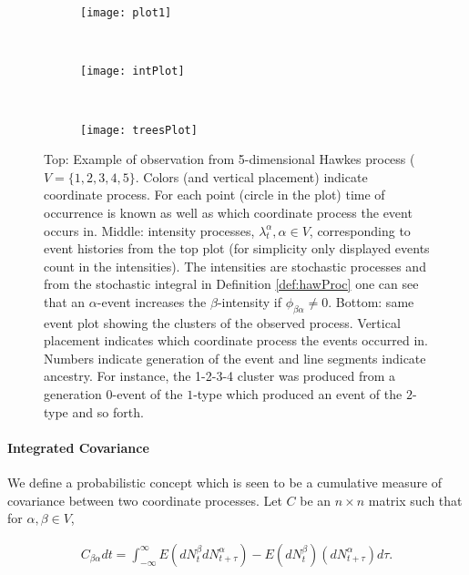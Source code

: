 \documentclass[accepted]{uai2021} %
\begin{document}
\begin{figure}
				\begin{subfigure}{0.48\linewidth}
					\centering
					\texttt{[image: plot1]}
				\end{subfigure} \\
				\begin{subfigure}{0.48\linewidth}
					\centering
					\texttt{[image: intPlot]}
				\end{subfigure} \\
				\begin{subfigure}{0.48\linewidth}
					\centering
					\texttt{[image: treesPlot]}
				\end{subfigure}
				\caption{Top: Example of observation from 5-dimensional Hawkes 
				process ($V = \{1,2,3,4,5\}$. Colors (and vertical placement) 
				indicate coordinate 
				process. For each point 
				(circle in the plot) time of occurrence is known as well as 
				which coordinate process the event occurs in. Middle: intensity 
				processes, $\lambda_t^\alpha, \alpha\in V$, corresponding to 
				event 
				histories from the top plot (for simplicity only displayed 
				events 
				count in the intensities). The intensities are stochastic 
				processes and from the stochastic integral in Definition 
				\ref{def:hawProc} one can see that an $\alpha$-event increases 
				the $\beta$-intensity if $\phi_{\beta\alpha} \neq 0$. 
				Bottom: same event plot showing the 
				clusters of the observed process. Vertical placement indicates 
				which coordinate process the events occurred in. Numbers 
				indicate 
				generation 
				of the event and line segments indicate ancestry. For instance, 
				the 1-2-3-4 cluster was produced from a generation 0-event of 
				the 
				$1$-type which produced an event of the $2$-type and so forth.}
			\label{fig:haw}
\end{figure}


\paragraph{Integrated Covariance}

We define a probabilistic concept which is seen to be a cumulative measure of 
covariance between two coordinate processes. Let $C$ be an $n\times n$ matrix 
such that for $\alpha,\beta\in V$,

\begin{align}
	C_{\beta\alpha} dt = \int_{-\infty}^{\infty} E(dN_t^\beta 
	dN_{t+\tau}^\alpha) - E(dN_t^\beta )(dN_{t+\tau}^\alpha) d\tau.
\end{align}
\end{document}
